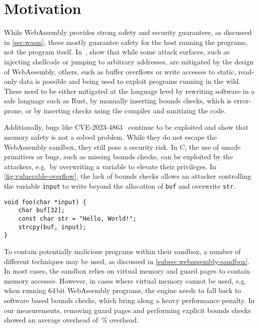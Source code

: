\chapter{Motivation}
\label{ch:motivation}


While WebAssembly provides strong safety and security guarantees, as discussed in \cref{sec:wasm}, these mostly guarantee safety for the host running the programs, not the program itself.
In~\cite{lehmann2020everything}, \citeauthor*{lehmann2020everything} show that while some attack surfaces, such as injecting shellcode or jumping to arbitrary addresses, are mitigated by the design of WebAssembly, others, such as buffer overflows or write accesses to static, read-only data is possible and being used to exploit programs running in the wild.
These need to be either mitigated at the language level by rewriting software in a safe language such as Rust, by manually inserting bounds checks, which is error-prone, or by inserting checks using the compiler and sanitizing the code.

Additionally, bugs like {CVE-2023-4863}~\cite{CVE-2023-4863} continue to be exploited and show that memory safety is not a solved problem.
While they do not escape the WebAssembly sandbox, they still pose a security risk.
In C, the use of unsafe primitives or bugs, such as missing bounds checks, can be exploited by the attackers, e.g.\ by overwriting a variable to elevate their privileges.
In \cref{fig:vulnerable-overflow}, the lack of bounds checks allows an attacker controlling the variable \texttt{input} to write beyond the allocation of \texttt{buf} and overwrite \texttt{str}.

\begin{figure*}
    \centering
    \begin{lstlisting}[frame=h,style=customc,label={lst:vulnerable-overflow}]
void foo(char *input) {
    char buf[32];
    const char str = "Hello, World!";
    strcpy(buf, input);
}
    \end{lstlisting}
    \caption{Vulnerable overflow}
    \label{fig:vulnerable-overflow}
\end{figure*}

To contain potentially malicious programs within their sandbox, a number of different techniques may be used, as discussed in \cref{subsec:webassembly-sandbox}.
In most cases, the sandbox relies on virtual memory and guard pages to contain memory accesses.
However, in cases where virtual memory cannot be used, e.g. when running 64\,bit WebAssembly programs, the engine needs to fall back to software based bounds checks, which bring along a heavy performance penalty.
In our measurements, removing guard pages and performing explicit bounds checks showed an average overhead of \,\% overhead.


